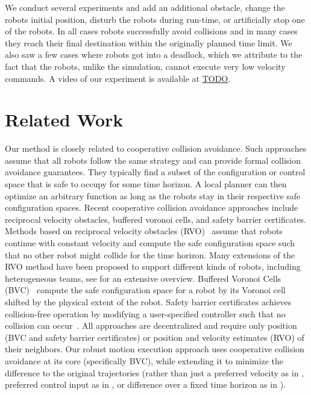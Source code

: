 \documentclass{svproc}
\newcommand{\todo}[1]{\textbf{\textcolor{red}{TODO: #1}}}
\begin{document}
We conduct several experiments and add an additional obstacle, change the robots initial position, disturb the robots during run-time, or artificially stop one of the robots.
In all cases robots successfully avoid collisions and in many cases they reach their final destination within the originally planned time limit.
We also saw a few cases where robots got into a deadlock, which we attribute to the fact that the robots, unlike the simulation, cannot execute very low velocity commands.
A video of our experiment is available at \url{TODO}.



\section{Related Work}
\label{sec:relatedWork}

Our method is closely related to cooperative collision avoidance.
Such approaches assume that all robots follow the same strategy and can provide formal collision avoidance guarantees.
They typically find a subset of the configuration or control space that is safe to occupy for some time horizon.
A local planner can then optimize an arbitrary function as long as the robots stay in their respective safe configuration spaces.
Recent cooperative collision avoidance approaches include reciprocal velocity obstacles, buffered voronoi cells, and safety barrier certificates.
Methods based on reciprocal velocity obstacles (RVO)~\cite{RVO} assume that robots continue with constant velocity and compute the safe configuration space such that no other robot might collide for the time horizon. Many extensions of the RVO method have been proposed to support different kinds of robots, including heterogeneous teams, see \cite{epsilonCCA} for an extensive overview.
Buffered Voronoi Cells (BVC)~\cite{bufferedVoronoiCells} compute the safe configuration space for a robot by its Voronoi cell shifted by the physical extent of the robot. 
Safety barrier certificates achieves collision-free operation by modifying a user-specified controller such that no collision can occur~\cite{barrierCertificates}.
All approaches are decentralized and require only position (BVC and safety barrier certificates) or position and velocity estimates (RVO) of their neighbors.
Our robust motion execution approach uses cooperative collision avoidance at its core (specifically BVC), while extending it to minimize the difference to the original trajectories (rather than just a preferred velocity as in \cite{epsilonCCA}, preferred control input as in \cite{barrierCertificates}, or difference over a fixed time horizon as in \cite{bufferedVoronoiCells}).
\end{document}

